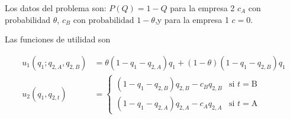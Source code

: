 \documentclass[12pt]{scrartcl} %
\begin{document}
\begin{Exercise}[name={Respuesta}]

  Los datos del problema son: $ P(Q) = 1 - Q$ para la empresa 2 $c_A$ con probabilidad $\theta$, $c_B \text{ con probabilidad } 1-\theta$,y para la empresa 1 $c = 0$.

  Las funciones de utilidad son

  \begin{align*}
    u_1(q_1; q_{2,A}, q_{2, B}) &= \theta(1 - q_1 - q_{2,A})q_1 + (1-\theta)(1 - q_1 - q_{2,B})q_1\\
      u_2(q_1, q_{2,t}) &=%
      \begin{cases}
        (1 - q_1 - q_{2,B})q_{2,B} - c_Bq_{2,B}&\text{si } t = \text{B}\\
        (1 - q_1 - q_{2,A})q_{2,A} - c_Aq_{2,A} &\text{si } t = \text{A}
      \end{cases}
  \end{align*}


\end{Exercise}
\end{document}
